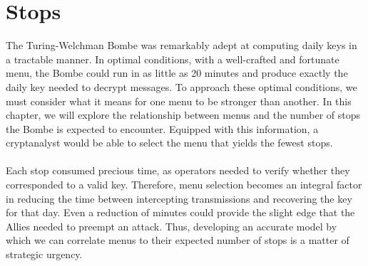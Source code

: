 \chapter{Stops}\label{stops}
The Turing-Welchman Bombe was remarkably adept at computing daily
keys in a tractable manner. In optimal conditions,
with a well-crafted and fortunate menu, the Bombe could run in as
little as 20 minutes and produce exactly the daily key needed to
decrypt messages.
To approach these optimal conditions, we must consider what it means
for one menu to be stronger than another. In this chapter, we will
explore the relationship
between menus and the number of stops the Bombe is expected to
encounter. Equipped with this information, a cryptanalyst would be
able to select the menu
that yields the fewest stops.
\\\\Each stop consumed precious
time, as operators needed to verify whether they corresponded to a
valid key. Therefore, menu selection becomes an integral factor
in reducing the time between intercepting transmissions and
recovering the key for that day. Even a reduction of minutes could
provide the slight edge that the Allies needed to preempt an attack.
Thus, developing an accurate model by which we can correlate menus to
their expected number of stops is a matter of strategic urgency.

